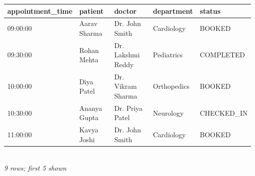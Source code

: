 {\scriptsize\setlength{\tabcolsep}{2.5pt}\begin{tabular}{lllll}\toprule
\textbf{appointment\_time} & \textbf{patient} & \textbf{doctor} & \textbf{department} & \textbf{status} \\\midrule
09:00:00 & Aarav Sharma & Dr. John Smith & Cardiology & BOOKED \\
09:30:00 & Rohan Mehta & Dr. Lakshmi Reddy & Pediatrics & COMPLETED \\
10:00:00 & Diya Patel & Dr. Vikram Sharma & Orthopedics & BOOKED \\
10:30:00 & Ananya Gupta & Dr. Priya Patel & Neurology & CHECKED\_IN \\
11:00:00 & Kavya Joshi & Dr. John Smith & Cardiology & BOOKED \\
\bottomrule\end{tabular}}\\[-1pt]{\tiny\itshape 9 rows; first 5 shown}
